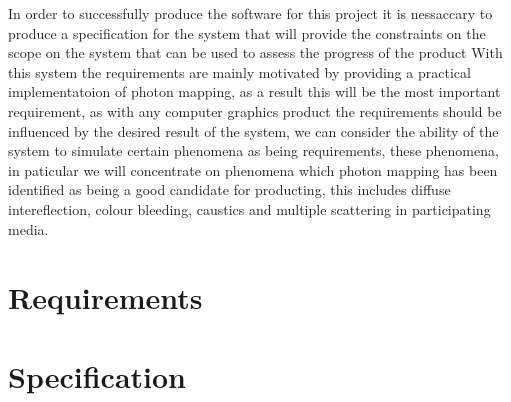 In order to successfully produce the software for this project it is nessaccary to produce a specification for the system
that will provide the constraints on the scope on the system that can be used to assess the progress of the product
With this system the requirements are mainly motivated by providing a practical implementatoion of photon mapping, as a result
this will be the most important requirement, as with any computer graphics product the requirements should be influenced by the
desired result of the system, we can consider the ability of the system to simulate certain phenomena as being requirements,
these phenomena, in paticular we will concentrate on phenomena which photon mapping has been identified as being a good candidate
for producting, this includes diffuse intereflection, colour bleeding, caustics and multiple scattering in participating media.

\section{Requirements}

\section{Specification}


